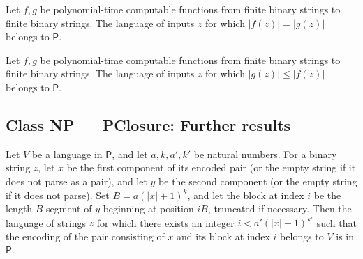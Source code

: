 \begin{theorem}
\label{Complexity.lenEq_preimage_mem_P}
\leanok
{}
Let $f,g$ be polynomial-time computable functions from finite binary strings to finite
binary strings. The language of inputs $z$ for which $|f(z)|=|g(z)|$ belongs to
$\mathsf{P}$.
\end{theorem}

\begin{theorem}
\label{Complexity.lenLe_preimage_mem_P}
\leanok
{}
Let $f,g$ be polynomial-time computable functions from finite binary strings to finite
binary strings. The language of inputs $z$ for which $|g(z)|\le |f(z)|$ belongs to
$\mathsf{P}$.
\end{theorem}

\subsection*{Class NP --- PClosure: Further results}

\begin{theorem}
\label{Complexity.mem_P_of_blockAny}
\leanok
{}
Let $V$ be a language in $\mathsf{P}$, and let $a,k,a',k'$ be natural numbers. For a
binary string $z$, let $x$ be the first component of its encoded pair (or the empty
string if it does not parse as a pair), and let $y$ be the second component (or the
empty string if it does not parse). Set $B=a(|x|+1)^k$, and let the block at index $i$
be the length-$B$ segment of $y$ beginning at position $iB$, truncated if necessary.
Then the language of strings $z$ for which there exists an integer $i<a'(|x|+1)^{k'}$
such that the encoding of the pair consisting of $x$ and its block at index $i$ belongs
to $V$ is in $\mathsf{P}$.
\end{theorem}

